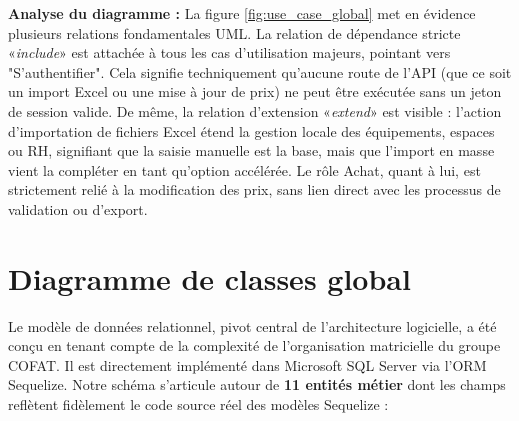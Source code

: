 \textbf{Analyse du diagramme :}
La figure \ref{fig:use_case_global} met en évidence plusieurs relations fondamentales UML. La relation de dépendance stricte «\textit{include}» est attachée à tous les cas d'utilisation majeurs, pointant vers "S'authentifier". Cela signifie techniquement qu'aucune route de l'API (que ce soit un import Excel ou une mise à jour de prix) ne peut être exécutée sans un jeton de session valide. De même, la relation d'extension «\textit{extend}» est visible : l'action d'importation de fichiers Excel étend la gestion locale des équipements, espaces ou RH, signifiant que la saisie manuelle est la base, mais que l'import en masse vient la compléter en tant qu'option accélérée. Le rôle Achat, quant à lui, est strictement relié à la modification des prix, sans lien direct avec les processus de validation ou d'export.

\section{Diagramme de classes global}
Le modèle de données relationnel, pivot central de l'architecture logicielle, a été conçu en tenant compte de la complexité de l'organisation matricielle du groupe COFAT. Il est directement implémenté dans Microsoft SQL Server via l'ORM Sequelize. Notre schéma s'articule autour de \textbf{11 entités métier} dont les champs reflètent fidèlement le code source réel des modèles Sequelize :

